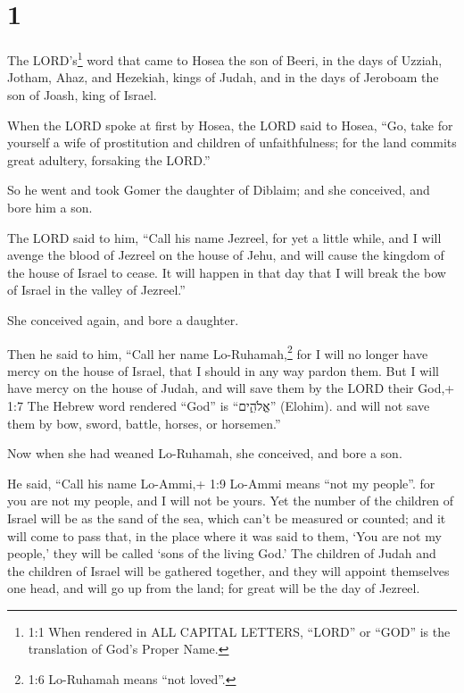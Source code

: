 \hypertarget{section}{%
\section{1}\label{section}}

 The LORD's\footnote{1:1 When rendered in ALL CAPITAL
  LETTERS, ``LORD'' or ``GOD'' is the translation of God's Proper Name.}
word that came to Hosea the son of Beeri, in the days of Uzziah, Jotham,
Ahaz, and Hezekiah, kings of Judah, and in the days of Jeroboam the son
of Joash, king of Israel.

 When the LORD spoke at first by Hosea, the LORD said to
Hosea, ``Go, take for yourself a wife of prostitution and children of
unfaithfulness; for the land commits great adultery, forsaking the
LORD.''

 So he went and took Gomer the daughter of Diblaim; and she
conceived, and bore him a son.

 The LORD said to him, ``Call his name Jezreel, for yet a
little while, and I will avenge the blood of Jezreel on the house of
Jehu, and will cause the kingdom of the house of Israel to cease.
 It will happen in that day that I will break the bow of
Israel in the valley of Jezreel.''

 She conceived again, and bore a daughter.

Then he said to him, ``Call her name Lo-Ruhamah,\footnote{1:6 Lo-Ruhamah
  means ``not loved''.} for I will no longer have mercy on the house of
Israel, that I should in any way pardon them.  But I will
have mercy on the house of Judah, and will save them by the LORD their
God,+ 1:7 The Hebrew word rendered ``God'' is ``אֱלֹהִ֑ים'' (Elohim).
and will not save them by bow, sword, battle, horses, or horsemen.''

 Now when she had weaned Lo-Ruhamah, she conceived, and bore
a son.

 He said, ``Call his name Lo-Ammi,+ 1:9 Lo-Ammi means ``not
my people''. for you are not my people, and I will not be yours.
 Yet the number of the children of Israel will be as the
sand of the sea, which can't be measured or counted; and it will come to
pass that, in the place where it was said to them, `You are not my
people,' they will be called `sons of the living God.'  The
children of Judah and the children of Israel will be gathered together,
and they will appoint themselves one head, and will go up from the land;
for great will be the day of Jezreel.

